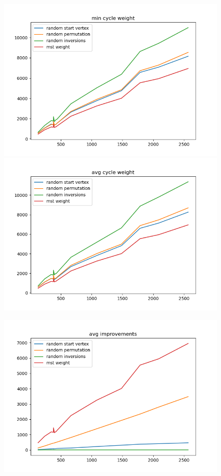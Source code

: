 \documentclass[12pt]{article}
\begin{document}
        \begin{figure}[h]
            \centering
            \includegraphics[width=0.75\linewidth]{img/min_cycle_weight.png}
            \label{fig:min_cycle_weight}
            \includegraphics[width=0.75\linewidth]{img/avg_cycle_weight.png}
            \label{fig:avg_cycle_weight}
        \end{figure}
        \newpage
        \begin{figure}[h]
            \centering
            \includegraphics[width=0.75\linewidth]{img/avg_improvements.png}
            \label{fig:avg_improvements}
        \end{figure}
\end{document}
